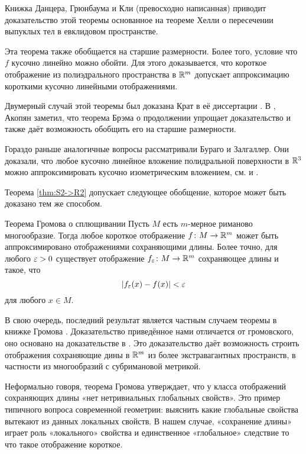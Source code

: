 Книжка Данцера, Грюнбаума и Кли \cite{DGK} 
(превосходно написанная) 
приводит доказательство этой теоремы основанное на теореме Хелли о пересечении выпуклых тел в евклидовом пространстве.

Эта теорема также обобщается на старшие размерности.
Более того, условие что $f$ кусочно линейно можно обойти.
Для этого доказывается, что короткое отображение из полиэдрального пространства в $\mathbb{R}^m$
допускает аппроксимацию короткими кусочно линейными отображениями.

Двумерный случай этой теоремы был доказана Крат в её диссертации \cite{krat}.
В \cite{akopyan},
Акопян заметил, что теорема Брэма о продолжении 
упрощает доказательство и также даёт возможность обобщить его на старшие размерности.

Гораздо раньше
аналогичные вопросы рассматривали Бураго и Залгаллер.
Они доказали, что любое кусочно линейное вложение полидральной поверхности в $\mathbb{R}^3$ 
можно аппроксимировать кусочно изометрическим вложением,
см. \cite{burago-zalgaller-0} и \cite{burago-zalgaller}. 


Теорема \ref{thm:S2->R2} 
допускает следующее обобщение,
которое может быть доказано тем же способом.

\begin{thm}{Теорема Громова о сплющивании}
Пусть $M$ есть $m$-мерное риманово многообразие.
Тогда любое короткое отображение $f\colon M\to \mathbb{R}^m$ 
может быть аппроксимировано отображениями сохраняющими длины.
Более точно, для любого $\varepsilon>0$ существует отображение $f_\varepsilon\colon M\to\mathbb{R}^m$
сохраняющее длины и такое, что 
$$|f_\varepsilon(x)-f(x)|<\varepsilon$$
для любого $x\in M$.
\end{thm}

В свою очередь, последний результат является
частным случаем теоремы в книжке Громова \cite[2.4.11]{gromov}.
Доказательство приведённое нами отличается от громовского,
оно основано на доказательстве в \cite{petrunin-inverse}.
Это доказательство даёт возможность строить отображения сохраняющие дины в $\mathbb{R}^m$
из более экстравагантных пространств, 
в частности из многообразий с субримановой метрикой.

Неформально говоря, 
теорема Громова утверждает, 
что у класса отображений  сохраняющих длины «нет нетривиальных глобальных свойств».
Это пример типичного вопроса современной геометрии:
выяснить какие глобальные свойства вытекают из данных локальных свойств.
В нашем случае, 
«сохранение длины» играет роль «локального» свойства
и единственное «глобальное» следствие то что такое отображение короткое.

